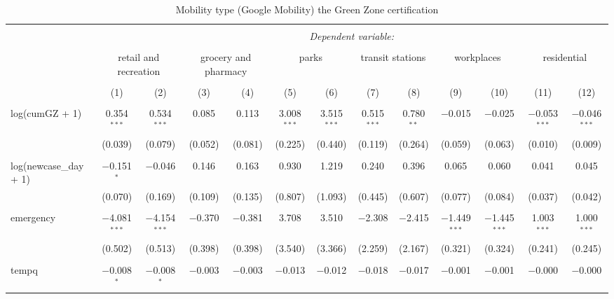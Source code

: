 
\begin{table}[!htbp] \centering 
  \caption{Mobility type (Google Mobility) the Green Zone certification} 
  \label{} 
\begin{tabular}{@{\extracolsep{5pt}}lcccccccccccc} 
\\[-1.8ex]\hline 
\hline \\[-1.8ex] 
 & \multicolumn{12}{c}{\textit{Dependent variable:}} \\ 
\cline{2-13} 
\\[-1.8ex] & \multicolumn{2}{c}{retail and recreation} & \multicolumn{2}{c}{grocery and pharmacy} & \multicolumn{2}{c}{parks} & \multicolumn{2}{c}{transit stations} & \multicolumn{2}{c}{workplaces} & \multicolumn{2}{c}{residential} \\ 
\\[-1.8ex] & (1) & (2) & (3) & (4) & (5) & (6) & (7) & (8) & (9) & (10) & (11) & (12)\\ 
\hline \\[-1.8ex] 
 log(cumGZ + 1) & 0.354$^{***}$ & 0.534$^{***}$ & 0.085 & 0.113 & 3.008$^{***}$ & 3.515$^{***}$ & 0.515$^{***}$ & 0.780$^{**}$ & $-$0.015 & $-$0.025 & $-$0.053$^{***}$ & $-$0.046$^{***}$ \\ 
  & (0.039) & (0.079) & (0.052) & (0.081) & (0.225) & (0.440) & (0.119) & (0.264) & (0.059) & (0.063) & (0.010) & (0.009) \\ 
  & & & & & & & & & & & & \\ 
 log(newcase\_day + 1) & $-$0.151$^{*}$ & $-$0.046 & 0.146 & 0.163 & 0.930 & 1.219 & 0.240 & 0.396 & 0.065 & 0.060 & 0.041 & 0.045 \\ 
  & (0.070) & (0.169) & (0.109) & (0.135) & (0.807) & (1.093) & (0.445) & (0.607) & (0.077) & (0.084) & (0.037) & (0.042) \\ 
  & & & & & & & & & & & & \\ 
 emergency & $-$4.081$^{***}$ & $-$4.154$^{***}$ & $-$0.370 & $-$0.381 & 3.708 & 3.510 & $-$2.308 & $-$2.415 & $-$1.449$^{***}$ & $-$1.445$^{***}$ & 1.003$^{***}$ & 1.000$^{***}$ \\ 
  & (0.502) & (0.513) & (0.398) & (0.398) & (3.540) & (3.366) & (2.259) & (2.167) & (0.321) & (0.324) & (0.241) & (0.245) \\ 
  & & & & & & & & & & & & \\ 
 tempq & $-$0.008$^{*}$ & $-$0.008$^{*}$ & $-$0.003 & $-$0.003 & $-$0.013 & $-$0.012 & $-$0.018 & $-$0.017 & $-$0.001 & $-$0.001 & $-$0.000 & $-$0.000 \\ 

\end{tabular}
\end{table}
